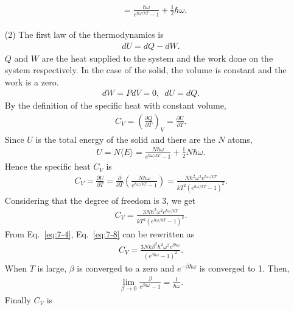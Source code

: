 \documentclass[floatfix,nofootinbib,superscriptaddress,fleqn]{revtex4-2}
\begin{document}
\begin{itemize}
\begin{align}
\begin{split}
      &=\frac{\hbar\omega}{e^{\hbar\omega/kT}-1} 
      + \frac{1}{2}\hbar\omega.
    \end{split}
  \end{align}
  \item[(2)] The first law of the thermodynamics is
  \begin{align}
    dU = dQ - dW.
  \end{align} 
  $Q$ and $W$ are the heat supplied to the system and 
  the work done on the system respectively. In the case of
  the solid, the volume is constant and the work is a zero.
  \begin{align}
    dW = PdV = 0,\,\,\, dU = dQ.
  \end{align}
  By the definition of the specific heat with constant volume,
  \begin{align}
    C_V = \left(\frac{\partial Q}{\partial T}\right)_V 
    =\frac{\partial U}{\partial T}.
  \end{align}
  Since $U$ is the total energy of the solid and there are the $N$
  atoms,
  \begin{align}
    U = N\langle E\rangle=\frac{N\hbar\omega}{e^{\hbar\omega/kT}-1} 
    + \frac{1}{2}N\hbar\omega.
  \end{align}
  Hence the specific heat $C_V$ is
  \begin{align}\label{eq:7-8}
    C_V = \frac{\partial U}{\partial T}
    = \frac{\partial }{\partial T}
    \left(\frac{N\hbar\omega}{e^{\hbar\omega/kT}-1}\right) 
    =\frac{N\hbar^2\omega^2e^{\hbar\omega/kT}}
    {kT^2\left(e^{\hbar\omega/kT}-1\right)^2}.
  \end{align}
  Considering that the degree of freedom is 3, we get
  \begin{align}\label{eq:7-9}
    C_V = \frac{3N\hbar^2\omega^2e^{\hbar\omega/kT}}
    {kT^2\left(e^{\hbar\omega/kT}-1\right)^2}.
  \end{align}
  From Eq.~\eqref{eq:7-4}, Eq.~\eqref{eq:7-8} can be rewritten as
  \begin{align}
    C_V=\frac{3Nk\beta^2\hbar^2\omega^2e^{\beta\hbar\omega}}
    {\left(e^{\beta\hbar\omega}-1\right)^2}.
  \end{align}
  When $T$ is large, $\beta$ is converged to a zero and 
  $e^{-\beta\hbar\omega}$ is converged to 1. Then,
  \begin{align}
    \lim_{\beta\rightarrow 0}\frac{\beta}
    {e^{\beta\hbar\omega}-1} = \frac{1}{\hbar\omega}.
  \end{align}
  Finally $C_V$ is
  \begin{align}

\end{align}
\end{itemize}
\end{document}
